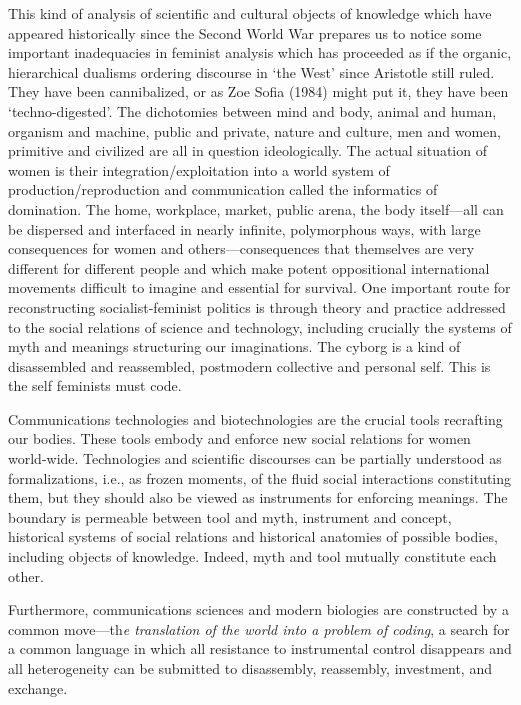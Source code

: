 \documentclass[DIV=12,%
               BCOR=10mm,%
               headinclude=false,%
               footinclude=false,open=any,%
               fontsize=11pt,%
               twoside,%
               paper=210mm:11in]%
               {scrbook}
\newcommand*{\Slash}{\slash\hspace{0pt}}
\begin{document}
This kind of analysis of scientific and cultural objects of knowledge which have appeared historically since the Second World War prepares us to notice some important inadequacies in feminist analysis which has proceeded as if the organic, hierarchical dualisms ordering discourse in ‘the West’ since Aristotle still ruled. They have been cannibalized, or as Zoe Sofia (1984) might put it, they have been ‘techno-digested’. The dichotomies between mind and body, animal and human, organism and machine, public and private, nature and culture, men and women, primitive and civilized are all in question ideologically. The actual situation of women is their integration\Slash{}exploitation into a world system of production\Slash{}reproduction and communication called the informatics of domination. The home, workplace, market, public arena, the body itself—all can be dispersed and interfaced in nearly infinite, polymorphous ways, with large consequences for women and others—consequences that themselves are very different for different people and which make potent oppositional international movements difficult to imagine and essential for survival. One important route for reconstructing socialist-feminist politics is through theory and practice addressed to the social relations of science and technology, including crucially the systems of myth and meanings structuring our imaginations. The cyborg is a kind of disassembled and reassembled, postmodern collective and personal self. This is the self feminists must code.


Communications technologies and biotechnologies are the crucial tools recrafting our bodies. These tools embody and enforce new social relations for women world-wide. Technologies and scientific discourses can be partially understood as formalizations, i.e., as frozen moments, of the fluid social interactions constituting them, but they should also be viewed as instruments for enforcing meanings. The boundary is permeable between tool and myth, instrument and concept, historical systems of social relations and historical anatomies of possible bodies, including objects of knowledge. Indeed, myth and tool mutually constitute each other.


Furthermore, communications sciences and modern biologies are constructed by a common move—th\emph{e translation of the world into a problem of coding}, a search for a common language in which all resistance to instrumental control disappears and all heterogeneity can be submitted to disassembly, reassembly, investment, and exchange.
\end{document}
